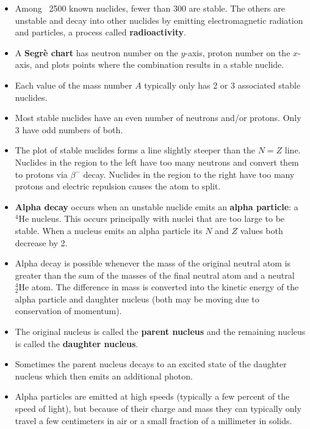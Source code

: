 \documentclass{article}
\begin{document}
\begin{itemize}
  \item Among ~2500 known nuclides, fewer than 300 are stable. The others are unstable and decay into other nuclides by emitting electromagnetic radiation and particles, a process called \textbf{radioactivity}.

  \item A \textbf{Segrè chart} has neutron number on the $y$-axis, proton number on the $x$-axis, and plots points where the combination results in a stable nuclide.

  \item Each value of the mass number $A$ typically only has 2 or 3 associated stable nuclides.

  \item Most stable nuclides have an even number of neutrons and/or protons. Only 3 have odd numbers of both.

  \item The plot of stable nuclides forms a line slightly steeper than the $N = Z$ line. Nuclides in the region to the left have too many neutrons and convert them to protons via $\beta^-$ decay. Nuclides in the region to the right have too many protons and electric repulsion causes the atom to split.

  \item \textbf{Alpha decay} occurs when an unstable nuclide emits an \textbf{alpha particle}: a $^4 \text{He}$ nucleus. This occurs principally with nuclei that are too large to be stable. When a nucleus emits an alpha particle its $N$ and $Z$ values both decrease by 2.

  \item Alpha decay is possible whenever the mass of the original neutral atom is greater than the sum of the masses of the final neutral atom and a neutral $^4_2 \text{He}$ atom. The difference in mass is converted into the kinetic energy of the alpha particle and daughter nucleus (both may be moving due to conservation of momentum).

  \item The original nucleus is called the \textbf{parent nucleus} and the remaining nucleus is called the \textbf{daughter nucleus}.

  \item Sometimes the parent nucleus decays to an excited state of the daughter nucleus which then emits an additional photon.

  \item Alpha particles are emitted at high speeds (typically a few percent of the speed of light), but because of their charge and mass they can typically only travel a few centimeters in air or a small fraction of a millimeter in solids.


\end{itemize}
\end{document}
